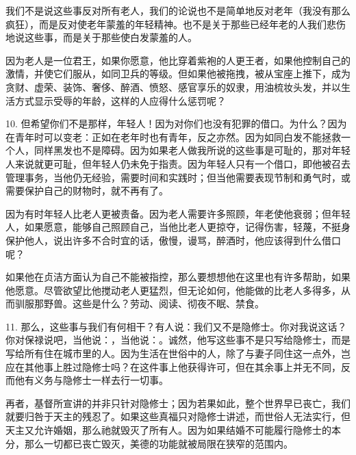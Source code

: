 我们不是说这些事反对所有老人，我们的论说也不是简单地反对老年（我没有那么疯狂），而是反对使老年蒙羞的年轻精神。也不是关于那些已经年老的人我们悲伤地说这些事，而是关于那些使白发蒙羞的人。\par

因为老人是一位君王，如果你愿意，他比穿着紫袍的人更王者，如果他控制自己的激情，并使它们服从，如同卫兵的等级。但如果他被拖拽，被从宝座上推下，成为贪财、虚荣、装饰、奢侈、醉酒、愤怒、感官享乐的奴隶，用油梳妆头发，并以生活方式显示受辱的年龄，这样的人应得什么惩罚呢？\par

10. 但希望你们不是那样，年轻人！因为对你们也没有犯罪的借口。为什么？因为在青年时可以变老：正如在老年时也有青年，反之亦然。因为如同白发不能拯救一个人，同样黑发也不是障碍。因为如果老人做我所说的这些事是可耻的，那对年轻人来说就更可耻，但年轻人仍未免于指责。因为年轻人只有一个借口，即他被召去管理事务，当他仍无经验，需要时间和实践时；但当他需要表现节制和勇气时，或需要保护自己的财物时，就不再有了。\par

因为有时年轻人比老人更被责备。因为老人需要许多照顾，年老使他衰弱；但年轻人，如果愿意，能够自己照顾自己，当他比老人更掠夺，记得伤害，轻蔑，不挺身保护他人，说出许多不合时宜的话，傲慢，谩骂，醉酒时，他应该得到什么借口呢？\par

如果他在贞洁方面认为自己不能被指控，那么要想想他在这里也有许多帮助，如果他愿意。尽管欲望比他搅动老人更猛烈，但无论如何，他能做的比老人多得多，从而驯服那野兽。这些是什么？劳动、阅读、彻夜不眠、禁食。\par

11. 那么，这些事与我们有何相干？有人说：我们又不是隐修士。你对我说这话？你对保禄说吧，当他说：，当他说：。诚然，他写这些事不是只写给隐修士，而是写给所有住在城市里的人。因为生活在世俗中的人，除了与妻子同住这一点外，岂应在其他事上胜过隐修士吗？在这件事上他获得许可，但在其余事上并无不同，反而他有义务与隐修士一样去行一切事。\par

再者，基督所宣讲的并非只针对隐修士；因为若果如此，整个世界早已丧亡，我们就要归咎于天主的残忍了。如果这些真福只对隐修士讲述，而世俗人无法实行，但天主又允许婚姻，那么祂就毁灭了所有人。因为如果结婚不可能履行隐修士的本分，那么一切都已丧亡毁灭，美德的功能就被局限在狭窄的范围内。\par

